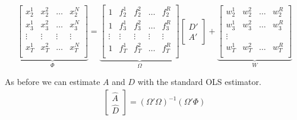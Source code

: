 \documentclass[11pt, letterpaper]{article}\usepackage[]{graphicx}\usepackage[]{color}
\begin{document}
\begin{equation}
\underbrace{\begin{bmatrix}
x^1_{2} & x^2_{2} & \dots & x^N_{2}\\
x^1_{3} & x^2_{3} & \dots & x^N_{3}\\
\vdots & \vdots & \vdots & \vdots \\
x^1_{T} & x^2_{T} & \dots & x^N_{T}\\
\end{bmatrix}}_{\Phi}
=
\underbrace{\begin{bmatrix}
1 & f^1_{2} & f^2_{2} & \dots & f^R_{2}\\
1 & f^1_{3} & f^2_{3} & \dots & f^R_{3}\\
\vdots & \vdots & \vdots & \vdots & \vdots \\
1 & f^1_{T} & f^2_{T} & \dots & f^R_{T}\\
\end{bmatrix}}_{\Omega}
\begin{bmatrix}
D'\\
A'
\end{bmatrix}
 +
\underbrace{\begin{bmatrix}
w^1_2 & w^2_2 & \dots & w^R_2\\
w^1_3 & w^2_3 & \dots & w^R_3\\
\vdots\\
w^1_T & w^2_T & \dots & w^R_T\\
\end{bmatrix}}_{W}
\end{equation}

As before we can estimate $A$ and $D$ with the standard OLS estimator.
\begin{align*}
\begin{bmatrix}
	\widehat{A}\\
	\widehat{D}
\end{bmatrix} =
(\Omega' \Omega)^{-1} (\Omega'\Phi)
\end{align*}
\end{document}
